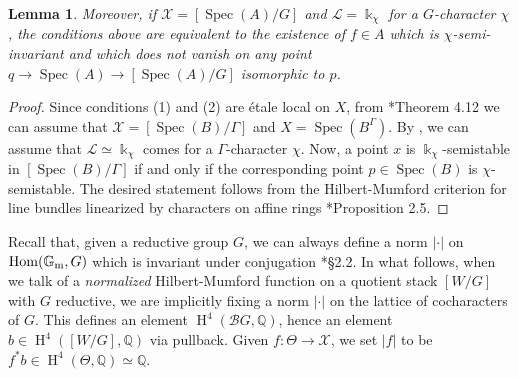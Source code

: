 \documentclass{amsart}
\newcommand{\bG}{\mathbb{G}}
\newcommand{\bQ}{\mathbb{Q}}
\newcommand{\oH}{\operatorname{H}}
\newcommand{\cB}{\mathcal{B}}
\newcommand{\cL}{\mathcal{L}}
\newcommand{\cX}{\mathcal{X}}
\newcommand{\spec}{\operatorname{Spec}}
\newcommand{\Hom}{\operatorname{Hom}}
\newcommand{\Gm}{\bG_{{\rm m}}}
\newtheorem{Lemma}[theorem]{Lemma}
\theoremstyle{definition}
\theoremstyle{definition}
\begin{document}
{\begin{Lemma}
     Moreover, if $\cX=[\spec(A)/G]$ and $\cL=\Bbbk_\chi$ for a $G$-character $\chi$, the conditions above are equivalent to the existence of $f\in A$ which is $\chi$-semi-invariant and which does not vanish on any point $q\to \spec(A)\to [\spec(A)/G]$ isomorphic to $p$.
 \end{Lemma}
 \begin{proof}
     Since conditions (1) and (2) are \'etale local on $X$, from \cite{luna}*{Theorem 4.12} we can assume that $\cX=[\spec(B)/\Gamma]$ and $X=\spec(B^\Gamma)$. 
     By , we can assume that $\cL\simeq\Bbbk_\chi$ comes for a $\Gamma$-character $\chi$.
Now, a point $x$ is $\Bbbk_\chi$-semistable in $[\spec(B)/\Gamma]$ if and only if the corresponding point $p\in\spec(B)$ is $\chi$-semistable. The desired statement follows from the Hilbert-Mumford criterion for line bundles linearized by characters on affine rings \cite{Hos}*{Proposition 2.5}. 
 \end{proof}
Recall that, given a reductive group $G$, we can always define a norm $|\cdot |$ on $\Hom(\Gm,G)$ which is invariant under conjugation \cite{Hos}*{\S 2.2}.
 In what follows, when we talk of a \emph{normalized} Hilbert-Mumford function on a quotient stack $[W/G]$ with $G$ reductive, we are implicitly fixing a norm $|\cdot |$ on the lattice of cocharacters of $G$. 
This defines an element $\oH^4(\cB G,\bQ)$, hence an element $b\in \oH^4([W/G],\bQ)$ via pullback. Given $f\colon \Theta \to \cX$, we set $|f|$ to be $f^*b\in \oH^4(\Theta,\bQ)\simeq\bQ$.
 
}
\end{document}
